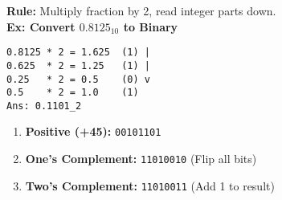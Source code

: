 \documentclass[a4paper, 8pt]{extarticle}
\begin{document}
\begin{multicols}{2}
\begin{tcolorbox}[title=Decimal $\rightarrow$ Binary (Fraction)]
\textbf{Rule:} Multiply fraction by 2, read integer parts down. \\
\textbf{Ex: Convert $0.8125_{10}$ to Binary}
\begin{verbatim}
0.8125 * 2 = 1.625  (1) |
0.625  * 2 = 1.25   (1) |
0.25   * 2 = 0.5    (0) v
0.5    * 2 = 1.0    (1)
Ans: 0.1101_2
\end{verbatim}
\end{tcolorbox}

\begin{tcolorbox}[title=2's Complement Example: -45 in 8-bit]
\begin{enumerate}
    \item \textbf{Positive (+45):} \texttt{00101101}
    \item \textbf{One's Complement:} \texttt{11010010} (Flip all bits)
    \item \textbf{Two's Complement:} \texttt{11010011} (Add 1 to result)
\end{enumerate}
\end{tcolorbox}

\end{multicols}
\end{document}
